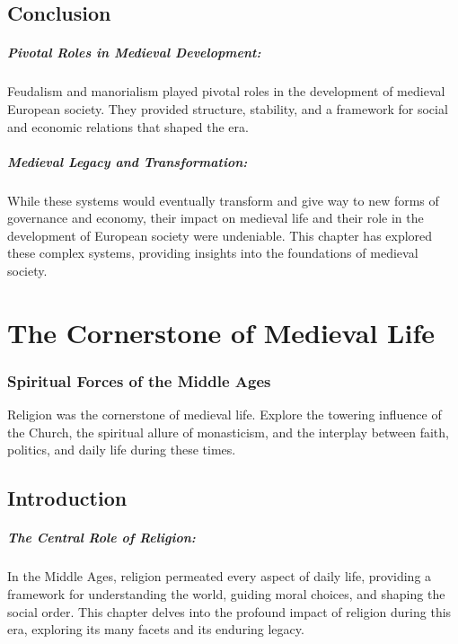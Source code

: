 \documentclass{book}
\begin{document}
\section*{Conclusion}

\paragraph{Pivotal Roles in Medieval Development:}
Feudalism and manorialism played pivotal roles in the development of medieval European society. They provided structure, stability, and a framework for social and economic relations that shaped the era.

\paragraph{Medieval Legacy and Transformation:}
While these systems would eventually transform and give way to new forms of governance and economy, their impact on medieval life and their role in the development of European society were undeniable. This chapter has explored these complex systems, providing insights into the foundations of medieval society.

\chapter{The Cornerstone of Medieval Life}
\subsection*{Spiritual Forces of the Middle Ages}
Religion was the cornerstone of medieval life. Explore the towering influence of the Church, the spiritual allure of monasticism, and the interplay between faith, politics, and daily life during these times.

\section*{Introduction}

\paragraph{The Central Role of Religion:}
In the Middle Ages, religion permeated every aspect of daily life, providing a framework for understanding the world, guiding moral choices, and shaping the social order. This chapter delves into the profound impact of religion during this era, exploring its many facets and its enduring legacy.
\end{document}
